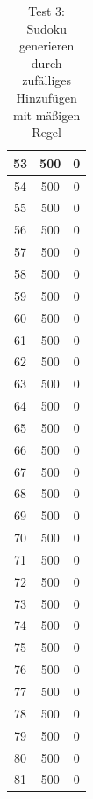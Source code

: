 \documentclass[11pt,a4paper]{article}
\begin{document}
\begin{table}[htbp!]
\begin{center}
\begin{tabular}{|*{3}{c|}}
 53 & 500 & 0 \\ \hline 
 54 & 500 & 0 \\ \hline 
 55 & 500 & 0 \\ \hline 
 56 & 500 & 0 \\ \hline 
 57 & 500 & 0 \\ \hline 
 58 & 500 & 0 \\ \hline 
 59 & 500 & 0 \\ \hline 
 60 & 500 & 0 \\ \hline 
 61 & 500 & 0 \\ \hline 
 62 & 500 & 0 \\ \hline 
 63 & 500 & 0 \\ \hline 
 64 & 500 & 0 \\ \hline 
 65 & 500 & 0 \\ \hline 
 66 & 500 & 0 \\ \hline 
 67 & 500 & 0 \\ \hline 
 68 & 500 & 0 \\ \hline 
 69 & 500 & 0 \\ \hline 
 70 & 500 & 0 \\ \hline 
 71 & 500 & 0 \\ \hline 
 72 & 500 & 0 \\ \hline 
 73 & 500 & 0 \\ \hline 
 74 & 500 & 0 \\ \hline 
 75 & 500 & 0 \\ \hline 
 76 & 500 & 0 \\ \hline 
 77 & 500 & 0 \\ \hline 
 78 & 500 & 0 \\ \hline 
 79 & 500 & 0 \\ \hline 
 80 & 500 & 0 \\ \hline 
 81 & 500 & 0 \\ \hline 
 \end{tabular} 
 \end{center}
 \caption{Test 3: Sudoku generieren durch zufälliges Hinzufügen mit mäßigen Regel}
\end{table} 
\end{document}
